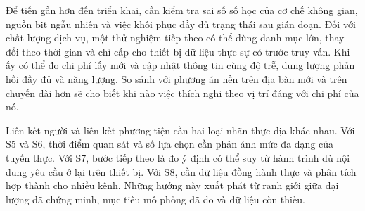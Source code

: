 Để tiến gần hơn đến triển khai, cần kiểm tra sai số số học của cơ chế không gian, nguồn bit
ngẫu nhiên và việc khôi phục đầy đủ trạng thái sau gián đoạn. Đối với chất lượng dịch vụ, một
thử nghiệm tiếp theo có thể dùng danh mục lớn, thay đổi theo thời gian và chỉ cấp cho thiết bị
dữ liệu thực sự có trước truy vấn. Khi ấy có thể đo chi phí lấy mới và cập nhật thông tin cùng
độ trễ, dung lượng phản hồi đầy đủ và năng lượng. So sánh với phương án nền trên địa bàn mới và
trên chuyến dài hơn sẽ cho biết khi nào việc thích nghi theo vị trí đáng với chi phí của nó.

Liên kết người và liên kết phương tiện cần hai loại nhãn thực địa khác nhau. Với S5 và S6, thời
điểm quan sát và số lựa chọn cần phản ánh mức đa dạng của tuyến thực. Với S7, bước tiếp theo là
đo ý định có thể suy từ hành trình dù nội dung yêu cầu ở lại trên thiết bị. Với S8, cần dữ liệu
đồng hành thực và phân tích hợp thành cho nhiều kênh. Những hướng này xuất phát từ ranh giới
giữa đại lượng đã chứng minh, mục tiêu mô phỏng đã đo và dữ liệu còn thiếu.

